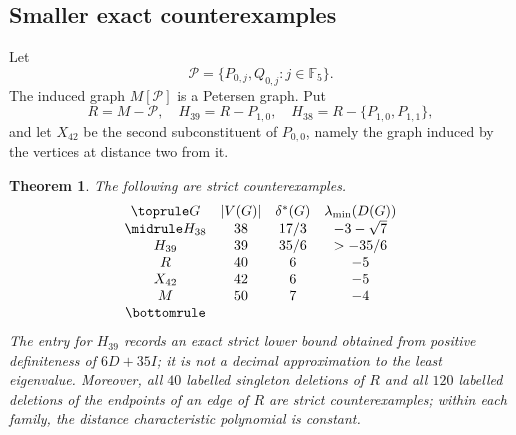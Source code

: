 \documentclass[a4paper,10pt,reqno]{amsart}
\theoremstyle{plain}
\newtheorem{theorem}{Theorem}[section]
\theoremstyle{definition}
\theoremstyle{remark}
\newcommand{\F}{\mathbb F_5}
\begin{document}
\subsection{Smaller exact counterexamples}

Let
\[
 \mathcal P=\{P_{0,j},Q_{0,j}:j\in\F\}.
\]
The induced graph \(M[\mathcal P]\) is a Petersen graph.  Put
\[
 R=M-\mathcal P,
 \quad H_{39}=R-P_{1,0},
 \quad H_{38}=R-\{P_{1,0},P_{1,1}\},
\]
and let \(X_{42}\) be the second subconstituent of \(P_{0,0}\), namely the
graph induced by the vertices at distance two from it.

\begin{theorem}\label{thm:explicit-examples}
The following are strict counterexamples.
\[
\begin{array}{c@{\quad}c@{\quad}c@{\quad}c}
\toprule
G&|V(G)|&\delta^*(G)&\lambda_{\min}(D(G))\\
\midrule
H_{38}&38&17/3&-3-\sqrt7\\
H_{39}&39&35/6&>-35/6\\
R&40&6&-5\\
X_{42}&42&6&-5\\
M&50&7&-4\\
\bottomrule
\end{array}
\]
The entry for \(H_{39}\) records an exact strict lower bound obtained from
positive definiteness of \(6D+35I\); it is not a decimal approximation to the
least eigenvalue.  Moreover, all \(40\) labelled singleton deletions of \(R\)
and all \(120\) labelled deletions of the endpoints of an edge of \(R\) are
strict counterexamples; within each family, the distance characteristic
polynomial is constant.
\end{theorem}
\end{document}
